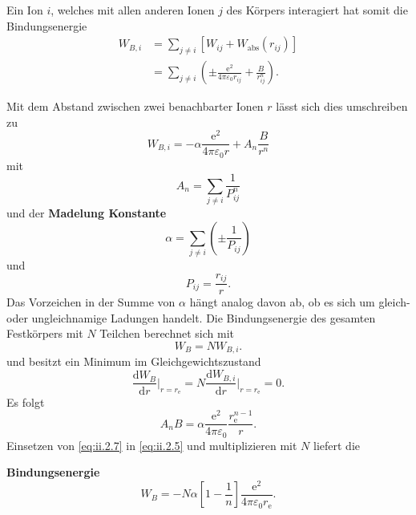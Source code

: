 Ein Ion $i$, welches mit allen anderen Ionen $j$ des Körpers interagiert hat somit die Bindungsenergie
\begin{align}
	\label{eq:ii.2.3}
	W_{B,i} &= \sum_{j \neq i}^{} \left[ W_{ij} + W_{\text{abs}} (r_{ij}) \right]  \\
	\label{eq:ii.2.4}
	&= \sum_{j \neq i}^{} \left( \pm \frac{\mathrm{e}^2}{4 \pi \varepsilon_0 r_{ij}} + \frac{B}{r_{ij}^{n}} \right).
\end{align}

Mit dem Abstand zwischen zwei benachbarter Ionen $r$ lässt sich dies umschreiben zu
\begin{equation}
	\label{eq:ii.2.5}
	W_{B,i} = - \alpha \frac{\mathrm{e}^2}{4 \pi \varepsilon_0 r} + A_{n} \frac{B}{r^{n}}
\end{equation}
mit
$$
A_{n} = \sum_{j \neq i}^{} \frac{1}{P_{ij}^{n}} 
$$ 
und der \textbf{Madelung Konstante}
$$
\alpha = \sum_{j \neq i}^{} \left( \pm \frac{1}{P_{ij}} \right)
$$ 
und
$$
P_{ij} = \frac{r_{ij}}{r}.
$$ 
Das Vorzeichen in der Summe von $\alpha$ hängt analog davon ab, ob es sich um gleich- oder ungleichnamige Ladungen handelt. 
Die Bindungsenergie des gesamten Festkörpers mit $N$ Teilchen berechnet sich mit
$$
W_{B} = N W_{B,i}.
$$ 
und besitzt ein Minimum im Gleichgewichtszustand 
$$
\frac{\mathrm{d} W_{B}}{\mathrm{d} r}  \Big|_{r=r_{\mathrm{e}}} = N \frac{\mathrm{d}W_{B,i}}{\mathrm{d} r}  \Big|_{r= r_{\mathrm{e}}} = 0.
$$
Es folgt
\begin{equation}
	\label{eq:ii.2.7}
	A_{n} B = \alpha \frac{\mathrm{e}^2}{4 \pi \varepsilon_0} \frac{r_{\mathrm{e}}^{n-1}}{r}.
\end{equation} 
Einsetzen von \ref{eq:ii.2.7} in \ref{eq:ii.2.5} und multiplizieren mit $N$ liefert die
\begin{important}
	\textbf{Bindungsenergie}
	\begin{equation}
		\label{eq:ii.2.8}
		W_{B} = - N \alpha \left[ 1 - \frac{1}{n} \right]  \frac{\mathrm{e}^2}{4 \pi \varepsilon_0 r_{\mathrm{e}}}.
	\end{equation}
\end{important}

